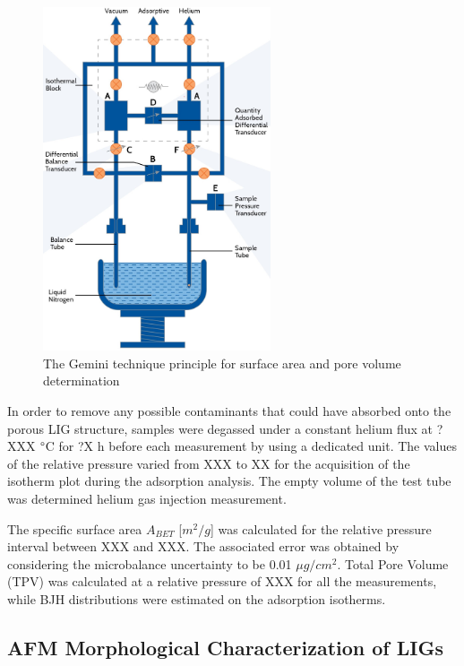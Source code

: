 \begin{figure}[H]
\centering
\includegraphics[width=0.6\textwidth]{Figures/ExperimentalSetup/Gemini-technique.jpg}
\medskip
\caption{The Gemini technique principle for surface area and pore volume determination \cite{gemini_brochure}}
\label{fig:gemini_technique}
\end{figure}

In order to remove any possible contaminants that could have absorbed onto the porous LIG structure, samples were degassed under a constant helium flux at ?XXX $\degree$C for ?X h before each measurement by using a dedicated unit. The values of the relative pressure varied from XXX to XX for the acquisition of the isotherm plot during the adsorption analysis. The empty volume of the test tube was determined helium gas injection measurement. 

The specific surface area $A_{BET}$ [$m^2/g$] was calculated for the relative pressure interval between XXX and XXX. The associated error was obtained by considering the microbalance uncertainty to be 0.01 $\mu g/cm^2$. Total Pore Volume (TPV) was calculated at a relative pressure of XXX for all the measurements, while BJH distributions were estimated on the adsorption isotherms.

\subsection{AFM Morphological Characterization of LIGs}

